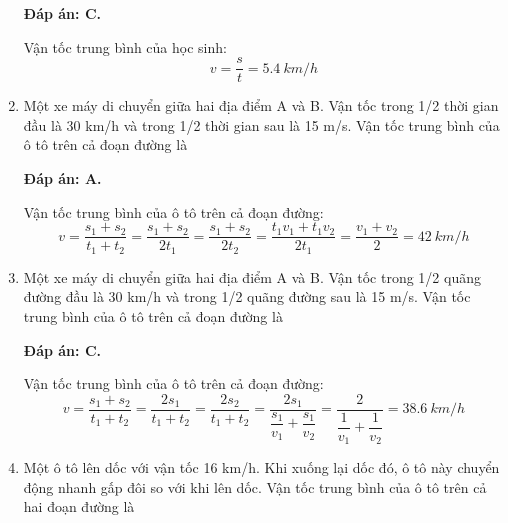 \begin{enumerate}[label=\bfseries Câu \arabic*:]
{	}
	
	\loigiai
	{\textbf{Đáp án: C.}
		
		Vận tốc trung bình của học sinh:
		$$v=\dfrac{s}{t} = \SI{5.4}{km/h}$$	
		
	}
	\item {}
	
	\cauhoi
	{Một xe máy di chuyển giữa hai địa điểm A và B. Vận tốc trong 1/2 thời gian đầu là 30 km/h và trong 1/2 thời gian sau là 15 m/s. Vận tốc trung bình của ô tô trên cả đoạn đường là
		
	}
	
	\loigiai
	{\textbf{Đáp án: A.}
		
		Vận tốc trung bình của ô tô trên cả đoạn đường:
		$$v=\dfrac{s_1+s_2}{t_1+t_2} = \dfrac{s_1+s_2}{2t_1} = \dfrac{s_1+s_2}{2t_2} = \dfrac{t_1v_1+t_1v_2}{2t_1} = \dfrac{v_1+v_2}{2} = \SI{42}{km/h}$$
		
	}
	
	\item {}
	
	\cauhoi
	{Một xe máy di chuyển giữa hai địa điểm A và B. Vận tốc trong 1/2 quãng đường đầu là 30 km/h và trong 1/2 quãng đường sau là 15 m/s. Vận tốc trung bình của ô tô trên cả đoạn đường là
	}
	
	\loigiai
	{	\textbf{Đáp án: C.}
		
	Vận tốc trung bình của ô tô trên cả đoạn đường:
	$$v=\dfrac{s_1+s_2}{t_1+t_2} = \dfrac{2s_1}{t_1+t_2} = \dfrac{2s_2}{t_1+t_2} = \dfrac{2s_1}{\dfrac{s_1}{v_1}+\dfrac{s_1}{v_2}} = \dfrac{2}{\dfrac{1}{v_1}+\dfrac{1}{v_2}} = \SI{38.6}{km/h}$$
		
	}
	\item {}
	
	\cauhoi
	{Một ô tô lên dốc với vận tốc 16 km/h. Khi xuống lại dốc đó, ô tô này chuyển động nhanh gấp đôi so với khi lên dốc. Vận tốc trung bình của ô tô trên cả hai đoạn đường là
	}
	

\end{enumerate}
